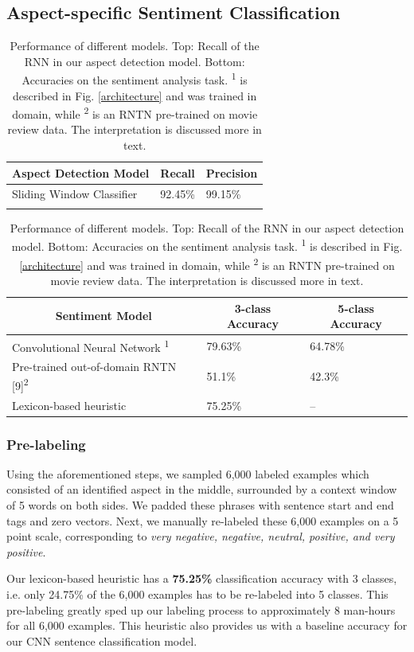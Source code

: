 \documentclass{article} %
\begin{document}
\subsection{Aspect-specific Sentiment Classification}

\begin{table}[t]
\begin{center}
\begin{tabular}{lll}
\multicolumn{1}{c}{\bf Aspect Detection Model}  &\multicolumn{1}{c}{\bf Recall}  &\multicolumn{1}{c}{\bf Precision} \\ \hline
Sliding Window Classifier & 92.45\%  & 99.15\%\\
&\\
\end{tabular}
\begin{tabular}{lll}
\multicolumn{1}{c}{\bf Sentiment Model}  &\multicolumn{1}{c}{\bf 3-class Accuracy} &\multicolumn{1}{c}{\bf 5-class Accuracy} \\ \hline
 Convolutional Neural Network \textsuperscript{1} & 79.63\% & 64.78\% \\
 Pre-trained out-of-domain RNTN [9]\textsuperscript{2}       & 51.1\% & 42.3\% \\
 Lexicon-based heuristic	& 75.25\% & -- \\
\end{tabular}
\end{center}
\caption{Performance of different models. Top: Recall of the RNN in our aspect detection model. Bottom: Accuracies on the sentiment analysis task. \textsuperscript{1} is described in Fig. \ref{architecture} and was trained in domain, while \textsuperscript{2} is an RNTN pre-trained on movie review data. The interpretation is discussed more in text.}
\label{ModelResultsTable}
\end{table}

\subsubsection{Pre-labeling}
Using the aforementioned steps, we sampled 6,000 labeled examples which consisted of an identified aspect in the middle, surrounded by a context window of 5 words on both sides. We padded these phrases with sentence start and end tags and zero vectors. Next, we manually re-labeled these 6,000 examples on a 5 point scale, corresponding to \textit{very negative, negative, neutral, positive, and very positive}.

Our lexicon-based heuristic has a \textbf{75.25\%} classification accuracy with 3 classes, i.e. only 24.75\% of the 6,000 examples has to be re-labeled into 5 classes. This pre-labeling greatly sped up our labeling process to approximately 8 man-hours for all 6,000 examples. This heuristic also provides us with a baseline accuracy for our CNN sentence classification model.
\end{document}
